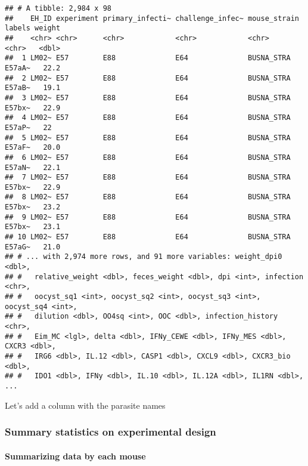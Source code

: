 \documentclass[
]{article}
\begin{document}
\begin{verbatim}
## # A tibble: 2,984 x 98
##    EH_ID experiment primary_infecti~ challenge_infec~ mouse_strain labels weight
##    <chr> <chr>      <chr>            <chr>            <chr>        <chr>   <dbl>
##  1 LM02~ E57        E88              E64              BUSNA_STRA   E57aA~   22.2
##  2 LM02~ E57        E88              E64              BUSNA_STRA   E57aB~   19.1
##  3 LM02~ E57        E88              E64              BUSNA_STRA   E57bx~   22.9
##  4 LM02~ E57        E88              E64              BUSNA_STRA   E57aP~   22  
##  5 LM02~ E57        E88              E64              BUSNA_STRA   E57aF~   20.0
##  6 LM02~ E57        E88              E64              BUSNA_STRA   E57aN~   22.1
##  7 LM02~ E57        E88              E64              BUSNA_STRA   E57bx~   22.9
##  8 LM02~ E57        E88              E64              BUSNA_STRA   E57bx~   23.2
##  9 LM02~ E57        E88              E64              BUSNA_STRA   E57bx~   23.1
## 10 LM02~ E57        E88              E64              BUSNA_STRA   E57aG~   21.0
## # ... with 2,974 more rows, and 91 more variables: weight_dpi0 <dbl>,
## #   relative_weight <dbl>, feces_weight <dbl>, dpi <int>, infection <chr>,
## #   oocyst_sq1 <int>, oocyst_sq2 <int>, oocyst_sq3 <int>, oocyst_sq4 <int>,
## #   dilution <dbl>, OO4sq <int>, OOC <dbl>, infection_history <chr>,
## #   Eim_MC <lgl>, delta <dbl>, IFNy_CEWE <dbl>, IFNy_MES <dbl>, CXCR3 <dbl>,
## #   IRG6 <dbl>, IL.12 <dbl>, CASP1 <dbl>, CXCL9 <dbl>, CXCR3_bio <dbl>,
## #   IDO1 <dbl>, IFNy <dbl>, IL.10 <dbl>, IL.12A <dbl>, IL1RN <dbl>, ...
\end{verbatim}

Let's add a column with the parasite names

\hypertarget{summary-statistics-on-experimental-design}{%
\subsubsection{Summary statistics on experimental
design}\label{summary-statistics-on-experimental-design}}

\hypertarget{summarizing-data-by-each-mouse}{%
\paragraph{Summarizing data by each
mouse}\label{summarizing-data-by-each-mouse}}
\end{document}
